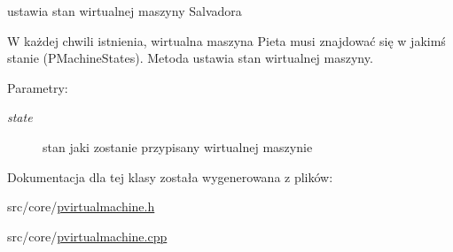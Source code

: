 ustawia stan wirtualnej maszyny Salvadora 

W każdej chwili istnienia, wirtualna maszyna Pieta musi znajdować się w jakimś stanie (PMachineStates). Metoda ustawia stan wirtualnej maszyny. \begin{Desc}
\item[Parametry:]
\begin{description}
\item[{\em state}]stan jaki zostanie przypisany wirtualnej maszynie \end{description}
\end{Desc}


Dokumentacja dla tej klasy została wygenerowana z plików:\begin{CompactItemize}
\item 
src/core/\hyperlink{pvirtualmachine_8h}{pvirtualmachine.h}\item 
src/core/\hyperlink{pvirtualmachine_8cpp}{pvirtualmachine.cpp}\end{CompactItemize}
